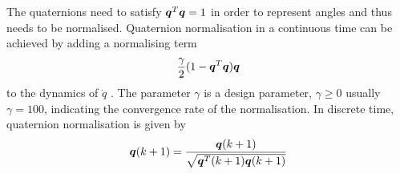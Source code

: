 The quaternions need to satisfy $\boldsymbol{q}^T\boldsymbol{q} = 1$ in order to represent angles and thus needs to be normalised.
Quaternion normalisation in a continuous time can be achieved by adding a normalising term
\begin{equation}
\frac{\gamma}{2} ( 1 - \boldsymbol{q}^T\boldsymbol{q})\boldsymbol{q}
\end{equation}
to the dynamics of $\dot{q}$ \citep[p. 31]{fossen2011}. The parameter $\gamma$ is a design parameter, $\gamma \geq 0$ usually $\gamma = 100$, indicating the convergence rate of the normalisation.%
In discrete time, quaternion normalisation is given by 
\begin{equation}
\boldsymbol{q}(k+1) = \frac{\boldsymbol{q}(k+1)}{\sqrt{\boldsymbol{q}^T(k+1)\boldsymbol{q}(k+1)}}
\end{equation}  



